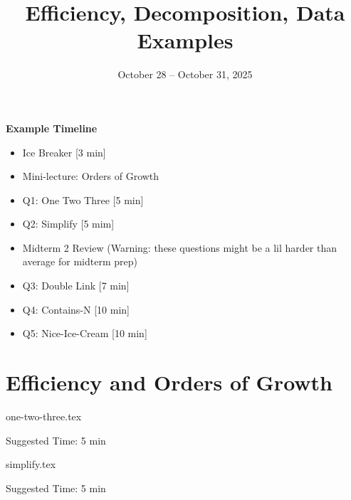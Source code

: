 \documentclass{exam}
\title{Efficiency, Decomposition, Data Examples}
\date{October 28 -- October 31, 2025}
\begin{document}
\maketitle

\begin{meta}
    \textbf{Example Timeline}
    \begin{itemize}
        \item Ice Breaker [3 min]
        \item Mini-lecture: Orders of Growth
        \item Q1: One Two Three [5 min]
        \item Q2: Simplify [5 mim]
        \item Midterm 2 Review (Warning: these questions might be a lil harder than average for midterm prep)
        \item Q3: Double Link [7 min]
        \item Q4: Contains-N [10 min]
        \item Q5: Nice-Ice-Cream [10 min]
    \end{itemize}

\end{meta}

\section{Efficiency and Orders of Growth}
\begin{questions}
    {one-two-three.tex}
    \begin{questionmeta}
        Suggested Time: 5 min
    \end{questionmeta}

    {simplify.tex}
    \begin{questionmeta}
        Suggested Time: 5 min
    \end{questionmeta}

\end{questions}
\end{document}

